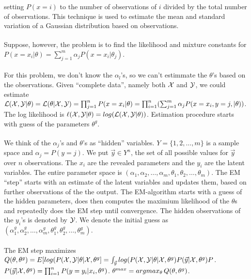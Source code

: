 setting $P(x=i)$ to the number of observations of $i$ divided by the total number of observations.
This technique is used to estimate the mean and standard variation of a Gaussian distribution based
on observations.
\\
\\
Suppose, however, the problem is to find the likelihood and mixture constants for
$P(x=x_i | \theta) = \sum_{j=1}^m \alpha_j P(x=x_i | \theta_j)$.
\\
\\
For this problem, we don't know the $\alpha_l$'s, so we can't estimmate the $\theta$'s based
on the observations. 
Given ``complete data'', namely both ${\cal X}$  and ${\cal Y}$, we could estimate
${\cal L}({\cal X}, {\cal Y} | \theta)= {\cal L}(\theta | {\cal X}, {\cal Y})=
\prod_{j=1}^n P(x=x_i | \theta) = \prod_{i=1}^n (\sum_{j=1}^m \alpha_j P(x=x_i , y = j, | \theta))$.
The log likelihood is
$\ell ({\cal X}, {\cal Y} | \theta) = log({\cal L}({\cal X}, {\cal Y} | \theta))$.  Estimation procedure starts with
guess of the parameters $\theta^g$.
\\
\\
We think of the $\alpha_j$'s and $\theta$'s as ``hidden''
variables. $Y = \{ 1, 2, \ldots, m \}$ is a sample space and $\alpha_j = P(y=j)$.
We put ${\vec y} \in Y^n$, the set of all possible values for ${\vec y}$ over
$n$ observations. The $x_i$ are the revealed parameters
and the $y_i$ are the latent variables.  The entire parameter space is $(\alpha_1 , \alpha_2 , \ldots , \alpha_m, 
\theta_1 , \theta_2 , \ldots , \theta_m)$.  The EM ``step'' starts with an estimate of the latent variables
and updates them, based on further observations of the the output.  The EM-algorithm starts with a
guess of the hidden parameters, does then computes the maximium likelihood of the $\theta$s
and repeatedly does the EM step until convergence.  The hidden observations of the
$y_i$'s is denoted by ${\cal Y}$.
We denote the initial guess as $(\alpha_1^g , \alpha_2^g , \ldots , \alpha_m^g, \theta_1^g , \theta_2^g , \ldots , \theta_m^g)$.
\\
\\
The EM step maximizes
$Q(\theta, \theta^g)= E[log(P({\cal X}, {\cal Y} | \theta | {\cal X}, \theta^g]=
\int_{\vec y} log(P({\cal X}, {\cal Y} | \theta | {\cal X}, \theta^g) P({\vec y}| {\cal X}, \theta^g)P$.
$P({\vec y} | {\cal X}, \theta^g)= \prod_{i=1}^n P(y=y_i| x_i, \theta^g)$.
$\theta^{max} = argmax_{\theta} \thinspace Q(\theta, \theta^g)$.
\\
\\
